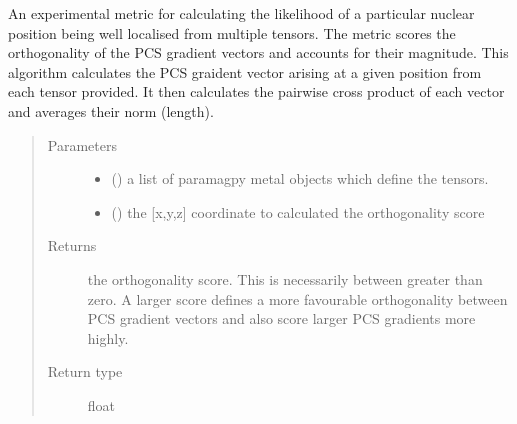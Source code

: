 \documentclass[a4paper,10pt,english,openany,oneside]{sphinxmanual}
\begin{document}
\begin{fulllineitems}
\label{\detokenize{reference/generated/paramagpy.fit.pcs_gradient_orthogonality_cross:paramagpy.fit.pcs_gradient_orthogonality_cross}}
\sphinxAtStartPar
An experimental metric for calculating the likelihood
of a particular nuclear position being well localised
from multiple tensors.
The metric scores the orthogonality of the PCS
gradient vectors and accounts for their magnitude.
This algorithm calculates the PCS graident
vector arising at a given position from each tensor
provided. It then calculates the pairwise cross product
of each vector and averages their norm (length).
\begin{quote}\begin{description}
\item[{Parameters}] \leavevmode\begin{itemize}
\item {} 
\sphinxAtStartPar
{} () \textendash{} a list of paramagpy metal objects which define the
tensors.

\item {} 
\sphinxAtStartPar
{} () \textendash{} the {[}x,y,z{]} coordinate to calculated the
orthogonality score

\end{itemize}

\item[{Returns}] \leavevmode
\sphinxAtStartPar
{} \textendash{} the orthogonality score. This is necessarily
between greater than zero. A larger
score defines a more favourable orthogonality
between PCS gradient vectors and also score larger
PCS gradients more highly.

\item[{Return type}] \leavevmode
\sphinxAtStartPar
float

\end{description}\end{quote}

\end{fulllineitems}
\end{document}
